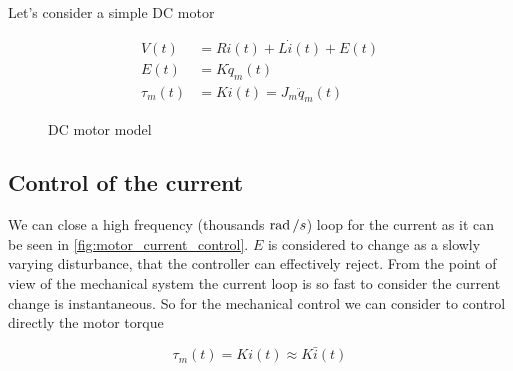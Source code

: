 Let's consider a simple DC motor

\begin{align*}
    V(t) &= R i(t) + L \dot{i}(t) + E(t) \\
    E(t) &= K \dot{q}_m(t) \\
    \tau_m(t) &= K i(t) = J_m \ddot{q}_m(t)
\end{align*}

\begin{figure}[htb]
\centering
{}
\caption{DC motor model}
\label{fig:motor_model}
\end{figure}

\subsection{Control of the current}

We can close a high frequency (thousands $\operatorname{rad}/s$) loop for the current as it can be seen in \autoref{fig:motor_current_control}. $E$ is considered to change as a slowly varying disturbance, that the controller can effectively reject.
From the point of view of the mechanical system the current loop is so fast to consider the current change is instantaneous.
So for the mechanical control we can consider to control directly the motor torque

\[
    \tau_m(t) = Ki(t) \approx K \bar{i}(t)
\]

